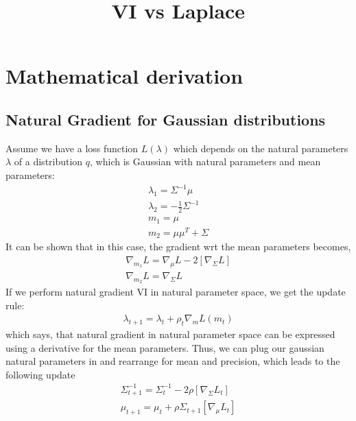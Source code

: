 \documentclass[a4paper]{scrartcl}
\begin{document}
\title{VI vs Laplace}
\maketitle

\section{Mathematical derivation}
  \subsection{Natural Gradient for Gaussian distributions}

    Assume we have a loss function $L(\lambda)$ which depends on the natural
    parameters $\lambda$ of a distribution $q$, which is Gaussian with natural
    parameters and mean parameters:
    \begin{align*}
        \lambda_1 = \Sigma^{-1} \mu\\
        \lambda_2 = - \frac{1}{2} \Sigma^{-1}\\
        m_1 = \mu\\
        m_2 = \mu \mu^T + \Sigma
    \end{align*}
    It can be shown that in this case, the gradient wrt the mean parameters becomes,
    \begin{align*}
        \nabla_{m_1} L = \nabla_\mu L - 2 [\nabla_\Sigma L]\\
        \nabla_{m_2} L = \nabla_\Sigma L
    \end{align*}
    If we perform natural gradient VI in natural parameter space, we get the update rule:
    \begin{align*}
      \lambda_{t+1} = \lambda_t + \rho_t \nabla_m L(m_t)
    \end{align*}
    which says, that natural gradient in natural parameter space can be expressed using
    a derivative for the mean parameters. Thus, we can plug our gaussian natural
    parameters in and rearrange for mean and precision, which leads to the
    following update
    \begin{align*}
        \Sigma_{t+1}^{-1} = \Sigma^{-1}_t - 2 \rho [\nabla_\Sigma L_t]\\
        \mu_{t+1} = \mu_t + \rho \Sigma_{t+1} [\nabla_\mu L_t]
    \end{align*}
\end{document}
